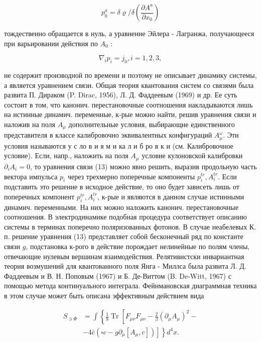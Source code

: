 \documentclass[10pt]{article}
\begin{document}
\[

p_{0}^{a}=\delta \varrho / \delta\left(\frac{\partial A^{a}}{\partial x_{0}}\right)

\]



тождественно обращается в нуль, а уравнение Эйлера - Лагранжа, получающееся при варьировании действия по $A_{0}$ :



\[

\nabla_{i} p_{i}=j_{0}, i=1,2,3,

\]



не содержит производной по времени и поэтому не описывает динамику системы, а является уравнением связи. Общая теория квантования систем со связями была развита П. Дираком (P. Dirac, 1956), Л. Д. Фаддеевым (1969) и др. Ее суть состоит в том, что канонич. перестановочные соотношения накладываются лишь на истинные динамич. переменные, к-рые можно найти, решив уравнения связи и наложив на поля $A_{\mu}$ дополнительные условия, выбирающие единственного представителя в классе калибровочно эквивалентных конфигураций $A_{\mu}^{\omega}$. Эти условия называются у с ло в и я м и ка л и б ро в к и (см. Калибровочное условие). Если, напр., наложить на поля $A_{\mu}$ условие кулоновской калибровки $\partial_{i} A_{i}=0$, то уравнения связи (13) можно явно решить, выразив продольную часть вектора импульса $p_{i}$ через трехмерно поперечные компоненты $p_{i}^{t r}, A_{i}^{t r}$. Если подставить это решение в исходное действие, то оно будет зависеть лишь от поперечных компонент $p_{i}^{t r}, A_{i}^{t r}$, к-рые и являются в данном случае истинными динамич. переменными. На них можно наложить канонич. перестановочные соотношения. В электродинамике подобная процедура соответствует описанию системы в терминах поперечно поляризованных фотонов. В случае неабелевых К. п. решение уравнения (13) представляет собой бесконечный ряд по константе связи $g$, подстановка к-рого в действие порождает нелинейные по полям члены, отвечающие нулевым вершинам взаимодействия. Релятивистски инвариантная теория возмушений для квантованного поля Янга - Миллса была развита Л. Д. Фаддеевым и В. Н. Поповым (1967) и Б. Де-Виттом (B. De-Witt, 1967) с помощью метода континуального интеграла. Фейнмановская диаграммная техника в этом случае может быть описана эффективным действием вида



\[

\begin{aligned}

S_{\ni \Phi} & =\int\left\{\frac { 1 } { 8 } \operatorname { T r } \left[F_{\mu \nu} F_{\mu \nu}-\frac{2}{\beta}\left(\partial_{\mu} A_{\mu}\right)^{2}-\right.\right. \\

& \left.\left.-4 \bar{c}\left(\square c-g \partial_{\mu}\left[A_{\mu}, c\right]\right)\right]\right\} d^{4} x .

\end{aligned}

\]
\end{document}
